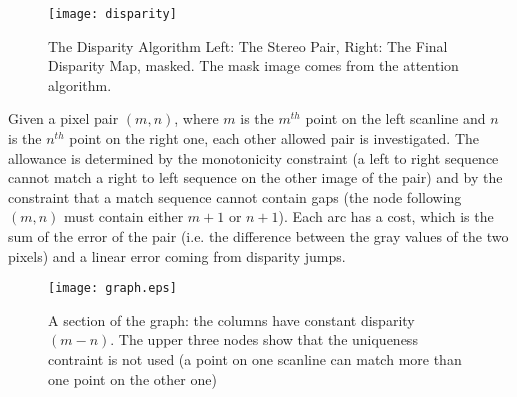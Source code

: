 \begin{figure}
\centering
\texttt{[image: disparity]}
\caption{The Disparity Algorithm  Left: The Stereo Pair, Right: The Final Disparity Map, masked. The mask image comes from the attention algorithm.}
\label{fig-disparity}
\end{figure}

Given a pixel pair $(m,n)$, where $m$ is the $m^{th}$ point on the left scanline and $n$ is the $n^{th}$ point on the right one, each other allowed pair is investigated. The allowance is determined by the monotonicity constraint (a left to right sequence cannot match a right to left sequence on the other image of the pair) and by the constraint that a match sequence cannot contain gaps (the node following $(m,n)$ must contain either $m+1$ or $n+1$).  
Each arc has a cost, which is the sum of the error of the pair (i.e. the difference between the gray values of the two pixels) and a linear error coming from disparity jumps.
\begin{figure}
	\centering
		\texttt{[image: graph.eps]}
	\caption{A section of the graph: the columns have constant disparity $(m-n)$. The upper three nodes show that the uniqueness contraint is not used (a point on one scanline can match more than one point on the other one)}
	\label{fig-graph}
\end{figure}
